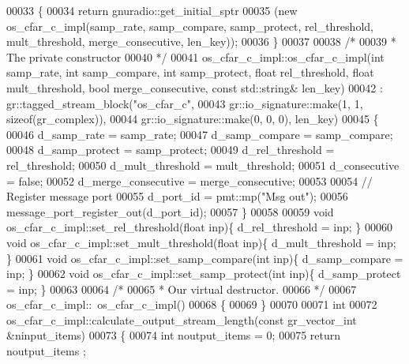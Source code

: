 \begin{DoxyCode}
00033     \{
00034       \textcolor{keywordflow}{return} gnuradio::get\_initial\_sptr
00035         (\textcolor{keyword}{new} os_cfar_c_impl(samp\_rate, samp\_compare, samp\_protect, rel\_threshold, mult\_threshold, 
      merge\_consecutive, len\_key));
00036     \}
00037 
00038     \textcolor{comment}{/*}
00039 \textcolor{comment}{     * The private constructor}
00040 \textcolor{comment}{     */}
00041     os_cfar_c_impl::os_cfar_c_impl(\textcolor{keywordtype}{int} samp_rate, \textcolor{keywordtype}{int} samp\_compare, \textcolor{keywordtype}{int} samp\_protect, \textcolor{keywordtype}{float} rel\_threshold, \textcolor{keywordtype}{
      float} mult\_threshold, \textcolor{keywordtype}{bool} merge\_consecutive, \textcolor{keyword}{const} std::string& len\_key)
00042       : gr::tagged\_stream\_block(\textcolor{stringliteral}{"os\_cfar\_c"},
00043               gr::io\_signature::make(1, 1, sizeof(gr\_complex)),
00044               gr::io\_signature::make(0, 0, 0), len\_key)
00045     \{
00046         d_samp_rate = samp_rate;
00047         d_samp_compare = samp\_compare;
00048         d_samp_protect = samp\_protect;
00049         d_rel_threshold = rel\_threshold;
00050         d_mult_threshold = mult\_threshold;
00051         d_consecutive = \textcolor{keyword}{false};
00052         d_merge_consecutive = merge\_consecutive;
00053         
00054         \textcolor{comment}{// Register message port}
00055         d_port_id = pmt::mp(\textcolor{stringliteral}{"Msg out"});
00056         message\_port\_register\_out(d_port_id);
00057     \}
00058     
00059     \textcolor{keywordtype}{void} os_cfar_c_impl::set_rel_threshold(\textcolor{keywordtype}{float} inp)\{ d_rel_threshold = inp; \}
00060     \textcolor{keywordtype}{void} os_cfar_c_impl::set_mult_threshold(\textcolor{keywordtype}{float} inp)\{ d_mult_threshold = inp; \}
00061     \textcolor{keywordtype}{void} os_cfar_c_impl::set_samp_compare(\textcolor{keywordtype}{int} inp)\{ d_samp_compare = inp; \}
00062     \textcolor{keywordtype}{void} os_cfar_c_impl::set_samp_protect(\textcolor{keywordtype}{int} inp)\{ d_samp_protect = inp; \}
00063 
00064     \textcolor{comment}{/*}
00065 \textcolor{comment}{     * Our virtual destructor.}
00066 \textcolor{comment}{     */}
00067     os_cfar_c_impl::~os_cfar_c_impl()
00068     \{
00069     \}
00070 
00071     \textcolor{keywordtype}{int}
00072     os_cfar_c_impl::calculate_output_stream_length(\textcolor{keyword}{const} gr\_vector\_int &ninput\_items)
00073     \{
00074       \textcolor{keywordtype}{int} noutput\_items = 0;
00075       \textcolor{keywordflow}{return} noutput\_items ;

\end{DoxyCode}
